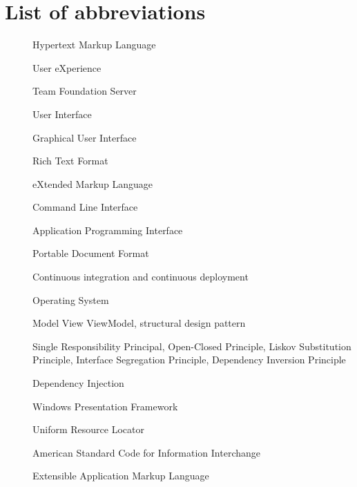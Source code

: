 \chapter*{List of abbreviations}

\begin{multicols}{2}
    \raggedright
    \begin{description}
        \item [] Hypertext Markup Language
        \item [] User eXperience
        \item [] Team Foundation Server
        \item [] User Interface
        \item [] Graphical User Interface
        \item [] Rich Text Format
        \item [] eXtended Markup Language
        \item [] Command Line Interface
        \item [] Application Programming Interface
        \item [] Portable Document Format
        \item [] Continuous integration and continuous deployment
        \item [] Operating System
        \item [] Model View ViewModel, structural design pattern \cite{katz_mvvm_2022}
        \item [] Single Responsibility Principal, Open-Closed Principle, Liskov Substitution Principle, Interface Segregation Principle, Dependency Inversion Principle \cite{hall_adaptive_2017}
        \item [] Dependency Injection \cite{deursen_dependency_2019}
        \item [] Windows Presentation Framework \cite{stilgar_state_2018}
        \item [] Uniform Resource Locator
        \item [] American Standard Code for Information Interchange \cite{randal_ascii_2015}
        \item [] Extensible Application Markup Language
    \end{description}
\end{multicols}

